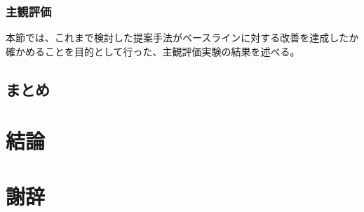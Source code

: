 \documentclass[12pt]{jarticle}
\numberwithin{equation}{section}    %
\numberwithin{figure}{section}      %
\numberwithin{table}{section}      %
\begin{document}
\clearpage

\subsubsection{主観評価}
本節では、これまで検討した提案手法がベースラインに対する改善を達成したか確かめることを目的として行った、主観評価実験の結果を述べる。

\clearpage

\subsection{まとめ}

\clearpage

\section{結論}

\clearpage

\section*{謝辞}

\clearpage



\end{document}
